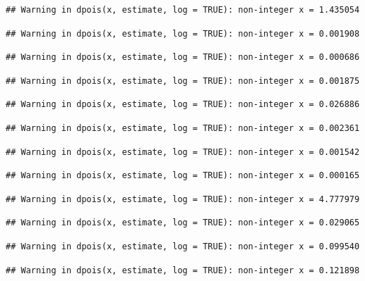 \documentclass[]{article}
\begin{document}
\begin{verbatim}
## Warning in dpois(x, estimate, log = TRUE): non-integer x = 1.435054
\end{verbatim}

\begin{verbatim}
## Warning in dpois(x, estimate, log = TRUE): non-integer x = 0.001908
\end{verbatim}

\begin{verbatim}
## Warning in dpois(x, estimate, log = TRUE): non-integer x = 0.000686
\end{verbatim}

\begin{verbatim}
## Warning in dpois(x, estimate, log = TRUE): non-integer x = 0.001875
\end{verbatim}

\begin{verbatim}
## Warning in dpois(x, estimate, log = TRUE): non-integer x = 0.026886
\end{verbatim}

\begin{verbatim}
## Warning in dpois(x, estimate, log = TRUE): non-integer x = 0.002361
\end{verbatim}

\begin{verbatim}
## Warning in dpois(x, estimate, log = TRUE): non-integer x = 0.001542
\end{verbatim}

\begin{verbatim}
## Warning in dpois(x, estimate, log = TRUE): non-integer x = 0.000165
\end{verbatim}

\begin{verbatim}
## Warning in dpois(x, estimate, log = TRUE): non-integer x = 4.777979
\end{verbatim}

\begin{verbatim}
## Warning in dpois(x, estimate, log = TRUE): non-integer x = 0.029065
\end{verbatim}

\begin{verbatim}
## Warning in dpois(x, estimate, log = TRUE): non-integer x = 0.099540
\end{verbatim}

\begin{verbatim}
## Warning in dpois(x, estimate, log = TRUE): non-integer x = 0.121898
\end{verbatim}
\end{document}
